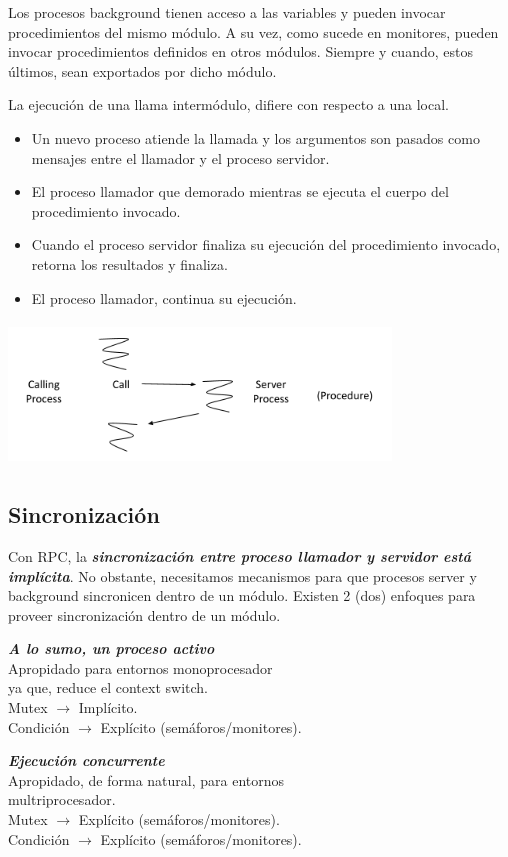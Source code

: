 \documentclass[a4paper, 10pt]{report}
\begin{document}
Los procesos background tienen acceso a las variables y pueden invocar procedimientos del mismo módulo. A su vez, como sucede en monitores, pueden invocar procedimientos definidos en otros módulos. Siempre y cuando, estos últimos, sean exportados por dicho módulo.

La ejecución de una llama intermódulo, difiere con respecto a una local.

\begin{itemize}
	\item Un nuevo proceso atiende la llamada y los argumentos son pasados como mensajes entre el llamador y el proceso servidor.
	\item El proceso llamador que demorado mientras se ejecuta el cuerpo del procedimiento invocado.
	\item Cuando el proceso servidor finaliza su ejecución del procedimiento invocado, retorna los resultados y finaliza.
	\item El proceso llamador, continua su ejecución.
\end{itemize}

\centerline{
	\includegraphics[width=4in, height=1.5in]{assets/rpc_execution.png}
}

\subsection{Sincronización}

Con RPC, la \textbf{\emph{sincronización entre proceso llamador y servidor está implícita}}. No obstante, necesitamos mecanismos para que procesos server y background sincronicen dentro de un módulo. Existen 2 (dos) enfoques para proveer sincronización dentro de un módulo.

\noindent
\begin{minipage}{0.5\textwidth}
\textbf{\emph{A lo sumo, un proceso activo}}
\\
Apropidado para entornos monoprocesador \\ya que, reduce el context switch.
\\
Mutex $\rightarrow$ Implícito.
\\
Condición $\rightarrow$ Explícito (semáforos/monitores).
\end{minipage}
\noindent
\begin{minipage}{0.5\textwidth}
\textbf{\emph{Ejecución concurrente}}
\\
Apropidado, de forma natural, para entornos \\ multriprocesador.
\\
Mutex $\rightarrow$ Explícito (semáforos/monitores).
\\
Condición $\rightarrow$ Explícito (semáforos/monitores).
\end{minipage}
\end{document}
